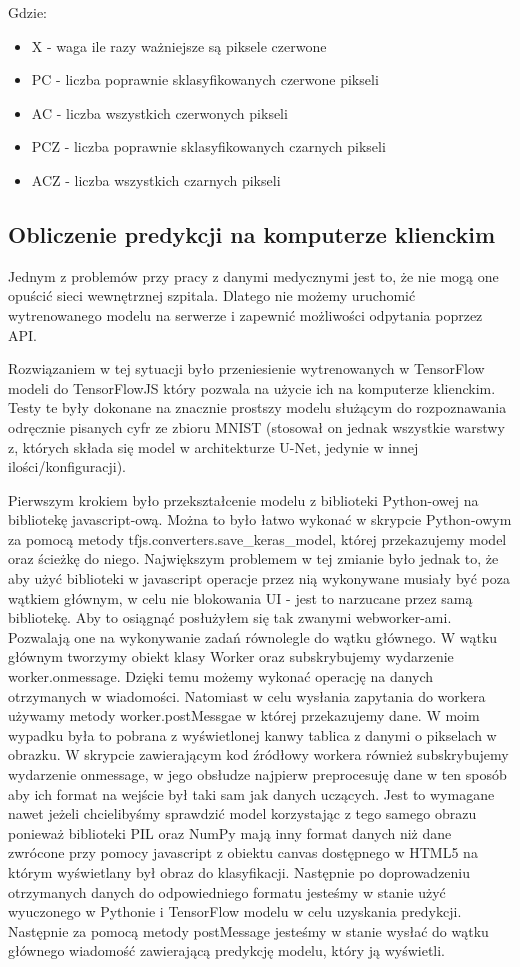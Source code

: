 \documentclass{article}
\begin{document}
Gdzie:
\begin{itemize}
    \item X - waga ile razy ważniejsze są piksele czerwone
    \item PC - liczba poprawnie sklasyfikowanych czerwone pikseli
    \item AC - liczba wszystkich czerwonych pikseli
    \item PCZ - liczba poprawnie sklasyfikowanych czarnych pikseli
    \item ACZ - liczba wszystkich czarnych pikseli
\end{itemize}

\subsection{Obliczenie predykcji na komputerze klienckim}
Jednym z problemów przy pracy z danymi medycznymi jest to, że nie mogą one opuścić sieci wewnętrznej szpitala.
Dlatego nie możemy uruchomić wytrenowanego modelu na serwerze i zapewnić możliwości odpytania poprzez API.

Rozwiązaniem w tej sytuacji było przeniesienie wytrenowanych w TensorFlow modeli do TensorFlowJS który pozwala na użycie ich na komputerze klienckim.
Testy te były dokonane na znacznie prostszy modelu służącym do rozpoznawania odręcznie pisanych cyfr ze zbioru MNIST (stosował on jednak wszystkie warstwy z, których składa się model w architekturze U-Net, jedynie w innej ilości/konfiguracji).

Pierwszym krokiem było przekształcenie modelu z biblioteki Python-owej na bibliotekę javascript-ową.
Można to było łatwo wykonać w skrypcie Python-owym za pomocą metody tfjs.converters.save\_keras\_model, której przekazujemy model oraz ścieżkę do niego.
Największym problemem w tej zmianie było jednak to, że aby użyć biblioteki w javascript operacje przez nią wykonywane musiały być poza wątkiem głównym, w celu nie blokowania UI - jest to narzucane przez samą bibliotekę.
Aby to osiągnąć posłużyłem się tak zwanymi webworker-ami.
Pozwalają one na wykonywanie zadań równolegle do wątku głównego.
W wątku głównym tworzymy obiekt klasy Worker oraz subskrybujemy wydarzenie worker.onmessage.
Dzięki temu możemy wykonać operację na danych otrzymanych w wiadomości. Natomiast w celu wysłania zapytania do workera używamy metody worker.postMessgae w której przekazujemy dane.
W moim wypadku była to pobrana z wyświetlonej kanwy tablica z danymi o pikselach w obrazku.
W skrypcie zawierającym kod źródłowy workera również subskrybujemy wydarzenie onmessage, w jego obsłudze najpierw preprocesuję dane w ten sposób aby ich format na wejście był taki sam jak danych uczących.
Jest to wymagane nawet jeżeli chcielibyśmy sprawdzić model korzystając z tego samego obrazu ponieważ biblioteki PIL oraz NumPy mają inny format danych niż dane zwrócone przy pomocy javascript z obiektu canvas dostępnego w HTML5 na którym wyświetlany był obraz do klasyfikacji.
Następnie po doprowadzeniu otrzymanych danych do odpowiedniego formatu jesteśmy w stanie użyć wyuczonego w Pythonie i TensorFlow modelu w celu uzyskania predykcji.
Następnie za pomocą metody postMessage jesteśmy w stanie wysłać do wątku głównego wiadomość zawierającą predykcję modelu, który ją wyświetli.
\end{document}

